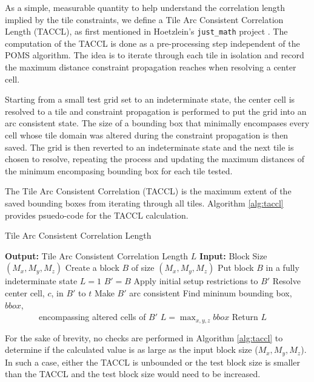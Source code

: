 As a simple, measurable quantity to help understand the correlation length implied by the tile constraints, we define a Tile Arc Consistent Correlation
Length (TACCL), as first mentioned in Hoetzlein's \texttt{just\_math} project \cite{Hoetzlein_2023}.
The computation of the TACCL is done as a pre-processing step independent of the POMS algorithm.
The idea is to iterate through each tile in isolation and record the maximum distance constraint propagation reaches when resolving a center cell.

Starting from a small test grid set to an indeterminate state,
the center cell is resolved to a tile and constraint propagation is performed to put the grid
into an arc consistent state.
The size of a bounding box that minimally encompases every cell whose tile domain was altered during the constraint propagation is then saved.
The grid is then reverted to an indeterminate state and the next tile is chosen to resolve, repeating the process and updating the maximum distances
of the minimum encompasing bounding box for each tile tested.

The Tile Arc Consistent Correlation (TACCL) is the maximum extent of the saved bounding boxes from iterating through all tiles.
Algorithm \ref{alg:taccl} provides psuedo-code for the TACCL calculation.

\begin{algorithm}
  \caption{Tile Arc Consistent Correlation Length}
  \label{alg:taccl}
  \begin{algorithmic}
    \State \textbf{Output:} Tile Arc Consistent Correlation Length $L$
    \State \textbf{Input:} Block Size $(M _ x, M _ y, M _ z)$
    \State Create a block $B$ of size $(M _ x, M _ y, M _ z)$
    \State Put block $B$ in a fully indeterminate state
    \State $L=1$
      \State $B' = B$
      \State Apply initial setup restrictions to $B'$
      \State Resolve center cell, $c$, in $B'$ to $t$
      \State Make $B'$ arc consistent
      \State Find mininum bounding box, $bbox$, \\ \ \ \ \ \ \ \ \ encompassing altered cells of $B'$
        \State $L = \max _ { x, y, z } bbox $
      \EndIf
    \EndFor
    \State Return $L$
  \end{algorithmic}
\end{algorithm}


For the sake of brevity, no checks are performed in Algorithm \ref{alg:taccl} to determine if the calculated value
is as large as the input block size ($M _ x, M _ y, M _ z$).
In such a case, either the TACCL is unbounded or the test block size is smaller than the TACCL and the test block size would
need to be increased.

